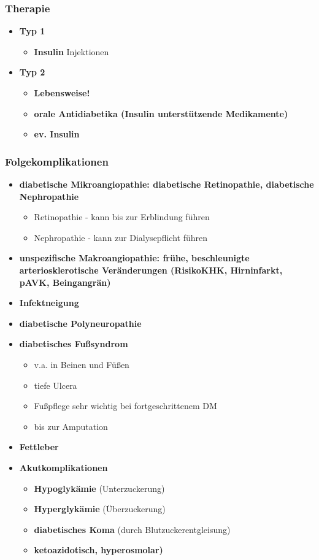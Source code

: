 	\subsubsection{Therapie}
			\begin{itemize}
				\item \textbf{Typ 1}
					\begin{itemize}
						\item \textbf{Insulin} Injektionen
					\end{itemize}
				\item \textbf{Typ 2}
					\begin{itemize}
						\item \textbf{Lebensweise!}
						\item \textbf{orale Antidiabetika (Insulin unterstützende Medikamente)}
						\item \textbf{ev. Insulin}
					\end{itemize}
			\end{itemize}
	\subsubsection{Folgekomplikationen}
			\begin{itemize}
				\item \textbf{diabetische Mikroangiopathie: diabetische Retinopathie, diabetische Nephropathie}
					\begin{itemize}
						\item Retinopathie - kann bis zur Erblindung führen
						\item Nephropathie - kann zur Dialysepflicht führen
					\end{itemize}
				\item \textbf{unspezifische Makroangiopathie: frühe, beschleunigte arteriosklerotische Veränderungen (RisikoKHK, Hirninfarkt, pAVK, Beingangrän)}
				\item \textbf{Infektneigung}
				\item \textbf{diabetische Polyneuropathie}
				\item \textbf{diabetisches Fußsyndrom}
					\begin{itemize}
						\item v.a. in Beinen und Füßen
						\item tiefe Ulcera
						\item Fußpflege sehr wichtig bei fortgeschrittenem DM
						\item bis zur Amputation
					\end{itemize}
				\item \textbf{Fettleber}
				\item \textbf{Akutkomplikationen}
					\begin{itemize}
						\item \textbf{Hypoglykämie} (Unterzuckerung)
						\item \textbf{Hyperglykämie} (Überzuckerung)
						\item \textbf{diabetisches Koma} (durch Blutzuckerentgleisung)
						\item \textbf{ketoazidotisch, hyperosmolar)}
					\end{itemize}
			\end{itemize}
			
